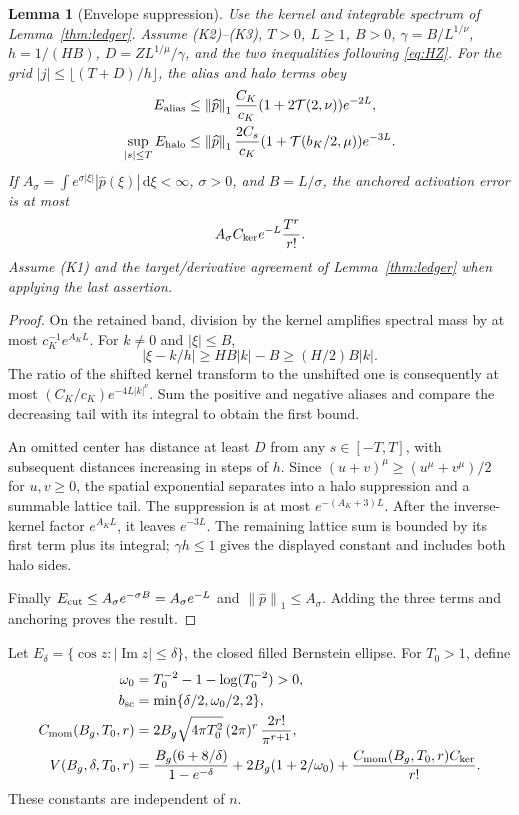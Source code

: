 \documentclass[11pt,letterpaper]{article}
\newcommand{\dd}{\,\mathrm d}
\newcommand{\norm}[1]{\left\lVert#1\right\rVert}
\newtheorem{lemma}{Lemma}[section]
\theoremstyle{definition}
\theoremstyle{remark}
\begin{document}
\begin{lemma}[Envelope suppression]\label{lem:envelope}
Use the kernel and integrable spectrum of Lemma~\ref{thm:ledger}.
Assume (K2)--(K3), \(T>0\), \(L\ge1\), \(B>0\),
\(\gamma=B/L^{1/\nu}\), \(h=1/(HB)\), \(D=ZL^{1/\mu}/\gamma\),
and the two inequalities following \eqref{eq:HZ}.
For the grid \(|j|\le\lfloor(T+D)/h\rfloor\), the alias and halo terms obey
\begin{align*}
 E_{\rm alias}
 &\le\norm{\widehat p}_1\frac{C_K}{c_K}
       (1+2\mathcal T(2,\nu))e^{-2L},\\
 \sup_{|s|\le T}E_{\rm halo}
 &\le\norm{\widehat p}_1\frac{2C_s}{c_K}
       (1+\mathcal T(b_K/2,\mu))e^{-3L}.
\end{align*}
If \(A_\sigma=\int e^{\sigma|\xi|}|\widehat p(\xi)|\dd\xi<\infty\),
\(\sigma>0\), and \(B=L/\sigma\), the anchored activation error is at most
\[
 A_\sigma C_{\rm ker}e^{-L}\frac{T^r}{r!}.
\]
Assume (K1) and the target/derivative agreement of Lemma~\ref{thm:ledger}
when applying the last assertion.
\end{lemma}
\begin{proof}
On the retained band, division by the kernel amplifies spectral mass by at
most \(c_K^{-1}e^{A_KL}\).
For \(k\ne0\) and \(|\xi|\le B\),
\[
 |\xi-k/h|\ge HB|k|-B\ge (H/2)B|k|.
\]
The ratio of the shifted kernel transform to the unshifted one is consequently
at most \((C_K/c_K)e^{-4L|k|^\nu}\).
Sum the positive and negative aliases and compare the decreasing tail with
its integral to obtain the first bound.

An omitted center has distance at least \(D\) from any \(s\in[-T,T]\), with
subsequent distances increasing in steps of \(h\). Since
\((u+v)^\mu\ge(u^\mu+v^\mu)/2\) for \(u,v\ge0\), the spatial exponential
separates into a halo suppression and a summable lattice tail.
The suppression is at most \(e^{-(A_K+3)L}\). After the inverse-kernel
factor \(e^{A_KL}\), it leaves \(e^{-3L}\).
The remaining lattice sum is bounded by its first term plus its integral;
\(\gamma h\le1\) gives the displayed constant and includes both halo sides.

Finally \(E_{\rm cut}\le A_\sigma e^{-\sigma B}=A_\sigma e^{-L}\) and
\(\norm{\widehat p}_1\le A_\sigma\). Adding the three terms and anchoring
proves the result.
\end{proof}

Let \(E_\delta=\{\cos z:|\operatorname{Im}z|\le\delta\}\), the closed filled
Bernstein ellipse. For \(T_0>1\), define
\begin{align}
 \omega_0&=T_0^{-2}-1-\log(T_0^{-2})>0,\nonumber\\
 b_{\rm sc}&=\min\{\delta/2,\omega_0/2,2\},\label{eq:scalar-rate}\\
 C_{\rm mom}(B_g,T_0,r)
   &=2B_g\sqrt{4\pi T_0^2}\,(2\pi)^r\,\frac{2r!}{\pi^{r+1}},\nonumber\\
 V(B_g,\delta,T_0,r)
   &=\frac{B_g(6+8/\delta)}{1-e^{-\delta}}
      +2B_g(1+2/\omega_0)
      +\frac{C_{\rm mom}(B_g,T_0,r)C_{\rm ker}}{r!}.\label{eq:V}
\end{align}
These constants are independent of \(n\).
\end{document}
